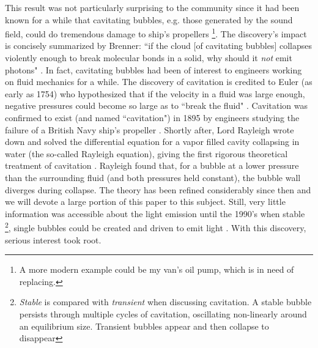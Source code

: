 \documentclass[prb,aps,nofootinbib,superscriptaddress,floatfix]{revtex4-2}
\begin{document}
This result was not particularly surprising to the community since it had been known for a while that cavitating bubbles, e.g. those generated by the sound field, could do tremendous damage to ship's propellers \footnote{A more modern example could be my van's oil pump, which is in need of replacing.}. The discovery's impact is concisely summarized by Brenner: ``if the cloud [of cavitating bubbles] collapses violently enough to break molecular bonds in a solid, why should it \emph{not} emit photons" \cite{brenner2002single}. In fact, cavitating bubbles had been of interest to engineers working on fluid mechanics for a while. The discovery of cavitation is credited to Euler (as early as 1754) who hypothesized that if the velocity in a fluid was large enough, negative pressures could become so large as to ``break the fluid" \cite{li2015introduction,gaitan1992sonoluminescence}. Cavitation was confirmed to exist (and named ``cavitation") in 1895 by engineers studying the failure of a British Navy ship's propeller \cite{li2015introduction}. Shortly after, Lord Rayleigh wrote down and solved the differential equation for a vapor filled cavity collapsing in water (the so-called Rayleigh equation), giving the first rigorous theoretical treatment of cavitation \cite{rayleigh1917pressure,plesset1977bubble}. Rayleigh found that, for a bubble at a lower pressure than the surrounding fluid (and both pressures held constant), the bubble wall diverges during collapse. The theory has been refined considerably since then \cite{prosperetti1999old,plesset1977bubble,plesset1977bubble,brenner2002single,lofstedt1995sonoluminescing,barber1992resolving} and we will devote a large portion of this paper to this subject. Still, very little information was accessible about the light emission until the 1990's when stable \footnote{\emph{Stable} is compared with \emph{transient} when discussing cavitation. A stable bubble persists through multiple cycles of cavitation, oscillating non-linearly around an equilibrium size. Transient bubbles appear and then collapse to disappear}, single bubbles could be created and driven to emit light \cite{gaitan1990experimental,gaitan1992sonoluminescence,crum1994sonoluminescence}. With this discovery, serious interest took root. 
\end{document}

